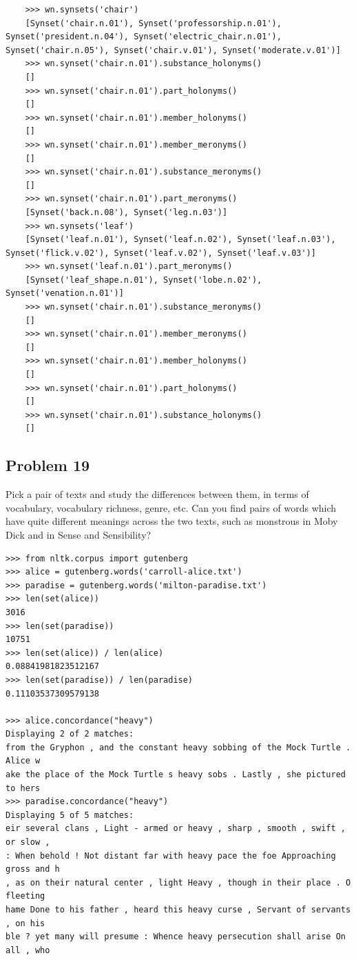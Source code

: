 \documentclass[12pt]{article}
\begin{document}
	\begin{lstlisting}
	>>> wn.synsets('chair')
	[Synset('chair.n.01'), Synset('professorship.n.01'), Synset('president.n.04'), Synset('electric_chair.n.01'), Synset('chair.n.05'), Synset('chair.v.01'), Synset('moderate.v.01')]
	>>> wn.synset('chair.n.01').substance_holonyms()
	[]
	>>> wn.synset('chair.n.01').part_holonyms()
	[]
	>>> wn.synset('chair.n.01').member_holonyms()
	[]
	>>> wn.synset('chair.n.01').member_meronyms()
	[]
	>>> wn.synset('chair.n.01').substance_meronyms()
	[]
	>>> wn.synset('chair.n.01').part_meronyms()
	[Synset('back.n.08'), Synset('leg.n.03')]
	>>> wn.synsets('leaf')
	[Synset('leaf.n.01'), Synset('leaf.n.02'), Synset('leaf.n.03'), Synset('flick.v.02'), Synset('leaf.v.02'), Synset('leaf.v.03')]
	>>> wn.synset('leaf.n.01').part_meronyms()
	[Synset('leaf_shape.n.01'), Synset('lobe.n.02'), Synset('venation.n.01')]
	>>> wn.synset('chair.n.01').substance_meronyms()
	[]
	>>> wn.synset('chair.n.01').member_meronyms()
	[]
	>>> wn.synset('chair.n.01').member_holonyms()
	[]
	>>> wn.synset('chair.n.01').part_holonyms()
	[]
	>>> wn.synset('chair.n.01').substance_holonyms()
	[]
	\end{lstlisting}
	
\subsection*{Problem 19} Pick a pair of texts and study the differences between them, in terms of vocabulary, vocabulary richness, genre, etc. Can you find pairs of words which have quite different meanings across the two texts, such as monstrous in Moby Dick and in Sense and Sensibility?

\begin{lstlisting}
>>> from nltk.corpus import gutenberg
>>> alice = gutenberg.words('carroll-alice.txt')
>>> paradise = gutenberg.words('milton-paradise.txt')
>>> len(set(alice))
3016
>>> len(set(paradise))
10751
>>> len(set(alice)) / len(alice)
0.08841981823512167
>>> len(set(paradise)) / len(paradise)
0.11103537309579138

>>> alice.concordance("heavy")
Displaying 2 of 2 matches:
from the Gryphon , and the constant heavy sobbing of the Mock Turtle . Alice w
ake the place of the Mock Turtle s heavy sobs . Lastly , she pictured to hers
>>> paradise.concordance("heavy")
Displaying 5 of 5 matches:
eir several clans , Light - armed or heavy , sharp , smooth , swift , or slow ,
: When behold ! Not distant far with heavy pace the foe Approaching gross and h
, as on their natural center , light Heavy , though in their place . O fleeting
hame Done to his father , heard this heavy curse , Servant of servants , on his
ble ? yet many will presume : Whence heavy persecution shall arise On all , who
\end{lstlisting}
\end{document}
